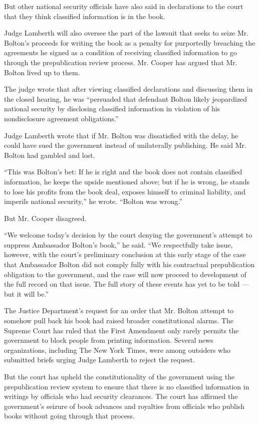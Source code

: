 But other national security officials have also said in declarations to
the court that they think classified information is in the book.

Judge Lamberth will also oversee the part of the lawsuit that seeks to
seize Mr. Bolton's proceeds for writing the book as a penalty for
purportedly breaching the agreements he signed as a condition of
receiving classified information to go through the prepublication review
process. Mr. Cooper has argued that Mr. Bolton lived up to them.

The judge wrote that after viewing classified declarations and
discussing them in the closed hearing, he was ``persuaded that defendant
Bolton likely jeopardized national security by disclosing classified
information in violation of his nondisclosure agreement obligations.''

Judge Lamberth wrote that if Mr. Bolton was dissatisfied with the delay,
he could have sued the government instead of unilaterally publishing. He
said Mr. Bolton had gambled and lost.

``This was Bolton's bet: If he is right and the book does not contain
classified information, he keeps the upside mentioned above; but if he
is wrong, he stands to lose his profits from the book deal, exposes
himself to criminal liability, and imperils national security,'' he
wrote. ``Bolton was wrong.''

But Mr. Cooper disagreed.

``We welcome today's decision by the court denying the government's
attempt to suppress Ambassador Bolton's book,'' he said. ``We
respectfully take issue, however, with the court's preliminary
conclusion at this early stage of the case that Ambassador Bolton did
not comply fully with his contractual prepublication obligation to the
government, and the case will now proceed to development of the full
record on that issue. The full story of these events has yet to be told
--- but it will be.''

The Justice Department's request for an order that Mr. Bolton attempt to
somehow pull back his book had raised broader constitutional alarms. The
Supreme Court has ruled that the First Amendment only rarely permits the
government to block people from printing information. Several news
organizations, including The New York Times, were among outsiders who
submitted briefs urging Judge Lamberth to reject the request.

But the court has upheld the constitutionality of the government using
the prepublication review system to ensure that there is no classified
information in writings by officials who had security clearances. The
court has affirmed the government's seizure of book advances and
royalties from officials who publish books without going through that
process.

